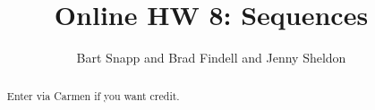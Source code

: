 \documentclass[handout,space,nooutcomes]{xourse}
\title{Online HW 8: Sequences}
\author{Bart Snapp and Brad Findell and Jenny Sheldon}
\begin{document}
\begin{abstract}
Enter via Carmen if you want credit.   
\end{abstract}
\maketitle


\end{document}

